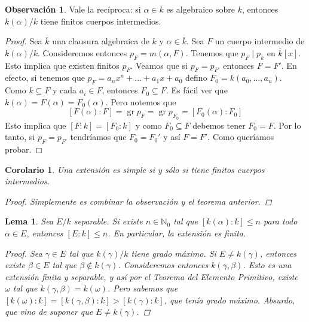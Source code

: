 \documentclass[12pt]{book}
\newtheorem{lem}[teo]{Lema}
\newtheorem{cor}[teo]{Corolario}
\theoremstyle{definition}
\newtheorem{obs}[teo]{Observación}
\newcommand{\NN}{\mathbb{N}}
\DeclareMathOperator{\gr}{gr}
\begin{document}
\begin{obs}
Vale la recíproca: si $\alpha\in\overline{k}$ es algebraico sobre $k$, entonces $k(\alpha)/k$ tiene finitos cuerpos intermedios.
\begin{proof}
Sea $\overline{k}$ una clausura algebraica de $k$ y $\alpha\in\overline{k}$. Sea $F$ un cuerpo intermedio de $k(\alpha)/k$. Consideremos entonces $p_F = m(\alpha,F)$. Tenemos que $p_F\mid p_k$ en $\overline{k}[x]$. Esto implica que existen finitos $p_F$. Veamos que si $p_F = p_{F'}$ entonces $F=F'$. En efecto, si tenemos que $p_F = a_n x^n + \ldots + a_1x+a_0$ defino $F_0 = k(a_0,\ldots,a_n)$. Como $k\subseteq F$ y cada $a_i\in F$, entonces $F_0\subseteq F$. Es fácil ver que $k(\alpha) = F(\alpha)=F_0(\alpha)$. Pero notemos que $$[F(\alpha):F] = \gr p_F = \gr p_{F_0} = [F_0(\alpha):F_0]$$ Esto implica que $[F:k] = [F_0 : k]$ y como $F_0\subseteq F$ debemos tener $F_0=F$. Por lo tanto, si $p_F = p_{F'}$ tendríamos que $F_0 = F_0'$ y así $F = F'$. Como queríamos probar.
\end{proof}
\end{obs}

\begin{cor}
Una extensión es simple si y sólo si tiene finitos cuerpos intermedios.
\begin{proof}
Simplemente es combinar la observación y el teorema anterior.
\end{proof}
\end{cor}

\begin{lem}
Sea $E/k$ separable. Si existe $n\in\NN_0$ tal que $[k(\alpha):k]\leq n$ para todo $\alpha\in E$, entonces $[E:k]\leq n$. En particular, la extensión es finita.
\begin{proof}
Sea $\gamma\in E$ tal que $k(\gamma)/k$ tiene grado máximo. Si $E\neq k(\gamma)$, entonces existe $\beta\in E$ tal que $\beta\notin k(\gamma)$. Consideremos entonces $k(\gamma,\beta)$. Esto es una extensión finita y separable, y así por el Teorema del Elemento Primitivo, existe $\omega$ tal que $k(\gamma,\beta) = k(\omega)$. Pero sabemos que $[k(\omega):k] = [k(\gamma,\beta):k] > [k(\gamma):k]$, que tenía grado máximo. Absurdo, que vino de suponer que $E\neq k(\gamma)$.
\end{proof}
\end{lem}
\end{document}

